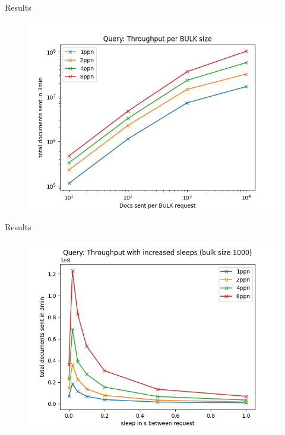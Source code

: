 \documentclass[compress,aspectratio=169]{beamer}
\begin{document}
  \begin{frame}{Results}
    \begin{figure}
      \includegraphics[height=0.9\textheight]{./analysis/querythroughput.png}
    \end{figure}
  \end{frame}
  \begin{frame}{Results}
    \begin{figure}
      \includegraphics[height=0.9\textheight]{./analysis/querythroughputsleep.png}
    \end{figure}
  \end{frame}
\end{document}

